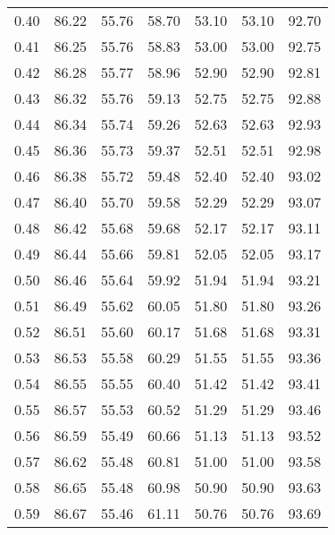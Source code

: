 \begin{tabular}{|c|c|c|c|c|c|c|}
      0.40 &     86.22 &     55.76 &      58.70 &   53.10 &      53.10 &         92.70 \\
      0.41 &     86.25 &     55.76 &      58.83 &   53.00 &      53.00 &         92.75 \\
      0.42 &     86.28 &     55.77 &      58.96 &   52.90 &      52.90 &         92.81 \\
      0.43 &     86.32 &     55.76 &      59.13 &   52.75 &      52.75 &         92.88 \\
      0.44 &     86.34 &     55.74 &      59.26 &   52.63 &      52.63 &         92.93 \\
      0.45 &     86.36 &     55.73 &      59.37 &   52.51 &      52.51 &         92.98 \\
      0.46 &     86.38 &     55.72 &      59.48 &   52.40 &      52.40 &         93.02 \\
      0.47 &     86.40 &     55.70 &      59.58 &   52.29 &      52.29 &         93.07 \\
      0.48 &     86.42 &     55.68 &      59.68 &   52.17 &      52.17 &         93.11 \\
      0.49 &     86.44 &     55.66 &      59.81 &   52.05 &      52.05 &         93.17 \\
      0.50 &     86.46 &     55.64 &      59.92 &   51.94 &      51.94 &         93.21 \\
      0.51 &     86.49 &     55.62 &      60.05 &   51.80 &      51.80 &         93.26 \\
      0.52 &     86.51 &     55.60 &      60.17 &   51.68 &      51.68 &         93.31 \\
      0.53 &     86.53 &     55.58 &      60.29 &   51.55 &      51.55 &         93.36 \\
      0.54 &     86.55 &     55.55 &      60.40 &   51.42 &      51.42 &         93.41 \\
      0.55 &     86.57 &     55.53 &      60.52 &   51.29 &      51.29 &         93.46 \\
      0.56 &     86.59 &     55.49 &      60.66 &   51.13 &      51.13 &         93.52 \\
      0.57 &     86.62 &     55.48 &      60.81 &   51.00 &      51.00 &         93.58 \\
      0.58 &     86.65 &     55.48 &      60.98 &   50.90 &      50.90 &         93.63 \\
      0.59 &     86.67 &     55.46 &      61.11 &   50.76 &      50.76 &         93.69 \\

\end{tabular}
